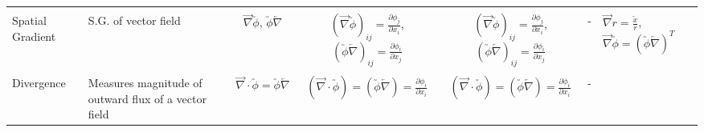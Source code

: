 \documentclass[10pt]{article}
\begin{document}
\begin{center}
\begin{tabular}{l m{3in} c c c c m{5in}}
\\[1ex]
\hline
\\[-1ex]
Spatial Gradient
&%
S.G. of vector field
&%
$ \overrightarrow{\nabla}\utilde{\phi}$,   $\utilde{\phi}\overleftarrow{\nabla}$
&%
$(\overrightarrow{\nabla}\utilde{\phi})_{ij} = \frac{\partial \phi_{j}}{\partial x_{i}}$, $(\utilde{\phi}\overleftarrow{\nabla})_{ij} = \frac{\partial \phi_{i}}{\partial x_{j}}$
&%
$(\overrightarrow{\nabla}\utilde{\phi})_{ij} = \frac{\partial \phi_{j}}{\partial x_{i}}$, $(\utilde{\phi}\overleftarrow{\nabla})_{ij} = \frac{\partial \phi_{i}}{\partial x_{j}}$
&%
-
&%
$\overrightarrow{\nabla}r = \frac{\utilde{x}}{r}$,   $\overrightarrow{\nabla}\utilde{\phi}=(\utilde{\phi}\overleftarrow{\nabla})^{T}$
\\[1ex]
\hline
\\[-1ex]
Divergence
&%
Measures magnitude of outward flux of a vector field
&%
$ \overrightarrow{\nabla}\cdot\utilde{\phi} = \utilde{\phi}\overleftarrow{\nabla} $
&%
$ (\overrightarrow{\nabla}\cdot\utilde{\phi}) = (\utilde{\phi}\overleftarrow{\nabla}) = \frac{\partial \phi_{i}}{\partial x_{i}} $
&%
$ (\overrightarrow{\nabla}\cdot\utilde{\phi}) = (\utilde{\phi}\overleftarrow{\nabla}) = \frac{\partial \phi_{i}}{\partial x_{i}} $
&%
-
&%


\end{tabular}
\end{center}
\end{document}
